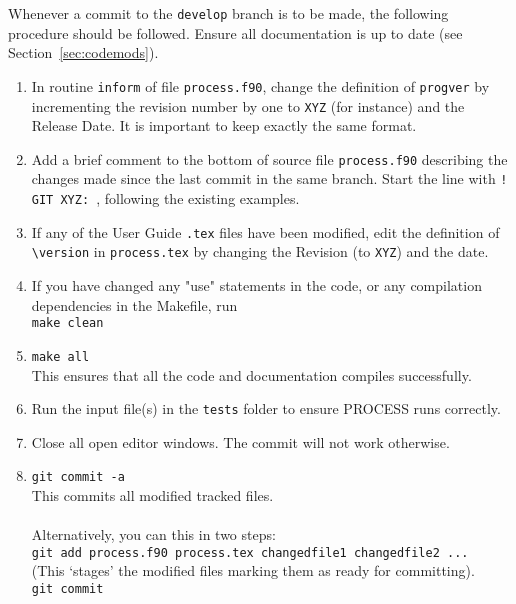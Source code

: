 Whenever a commit to the \texttt{develop} branch is to be made, the following
procedure should be followed. Ensure all documentation is up to date (see
Section~\ref{sec:codemods}).
\begin{enumerate}

\item In routine \texttt{inform} of file \texttt{process.f90}, change the
  definition of \texttt{progver} by incrementing the revision number by one to
  \texttt{XYZ} (for instance) and the Release Date. It is important to keep
  exactly the same format.

\item Add a brief comment to the bottom of source file \texttt{process.f90}
  describing the changes made since the last commit in the same branch. Start
  the line with \texttt{! GIT XYZ: }, following the existing examples.

\item If any of the User Guide \texttt{.tex} files have been modified, edit
  the definition of \verb+\version+ in \texttt{process.tex} by changing the
  Revision (to \texttt{XYZ}) and the date.

\item If you have changed any "use" statements in the code, or any compilation dependencies in the Makefile, run \\
\texttt{make clean}

\item \texttt{make all} \\
This ensures that all the code and documentation compiles successfully.

\item Run the input file(s) in the \texttt{tests} folder to ensure PROCESS runs correctly.

\item
Close all open editor windows.  The commit will not work otherwise.

\item   \texttt{git commit -a} \\
  This commits all modified tracked files.\\
  \\
  Alternatively, you can this in two steps:\\
  \texttt{git add process.f90 process.tex changedfile1 changedfile2 ...}  \\
  (This `stages' the modified files marking them as ready for committing).  \\
  \texttt{git commit}


\end{enumerate}

